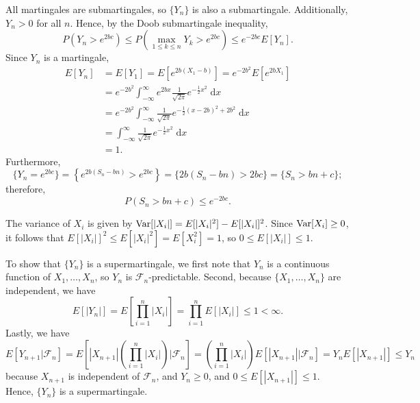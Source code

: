 \documentclass{homework}
\newcommand{\fil}{\mathcal{F}}
\begin{document}
	All martingales are submartingales, so $\{Y_n\}$ is also a submartingale. Additionally, $Y_n > 0$ for all $n$. Hence, by the Doob submartingale inequality,
	\begin{equation*}
		P\left(Y_n > e^{2bc}\right) \le P\left(\max_{1\le k\le n}Y_k > e^{2bc}\right) \le e^{-2bc}E[Y_n].
	\end{equation*}
	Since $Y_n$ is a martingale,
	\begin{align*}
		E[Y_n] &= E[Y_1] = E\left[e^{2b(X_1 - b)}\right] = e^{-2b^2}E\left[e^{2bX_1}\right] \\
		&= e^{-2b^2}\int_{-\infty}^\infty e^{2bx}\frac{1}{\sqrt{2\pi}}e^{-\frac{1}{2}x^2}\;\text{d}x \\
		&= e^{-2b^2}\int_{-\infty}^\infty \frac{1}{\sqrt{2\pi}}e^{-\frac{1}{2}(x-2b)^2 + 2b^2}\;\text{d}x \\
		&= \int_{-\infty}^\infty\frac{1}{\sqrt{2\pi}}e^{-\frac{1}{2}x^2}\;\text{d}x \\
		&= 1.
	\end{align*}
	Furthermore,
	\begin{equation*}
		\{Y_n = e^{2bc}\} = \left\{e^{2b(S_n - bn)} > e^{2bc}\right\} = \{2b(S_n - bn) > 2bc\} = \{S_n > bn + c\};
	\end{equation*}
	therefore,
	\begin{equation*}
		P(S_n > bn +c) \le e^{-2bc}.
	\end{equation*}
	
	\question The variance of $X_i$ is given by $\mathrm{Var}[|X_i|] = E[|X_i|^2] - E[|X_i|]^2$. Since $\mathrm{Var}[X_i] \ge 0$, it follows that $E[|X_i|]^2 \le E[|X_i|^2] = E[X_i^2] = 1$, so $0 \le E[|X_i|] \le 1$. 
	
	To show that $\{Y_n\}$ is a supermartingale, we first note that $Y_n$ is a continuous function of $X_1,\dots, X_n$, so $Y_n$ is $\fil_n$-predictable. Second, because $\{X_1,\dots, X_n\}$ are independent, we have
	\begin{equation*}
		E[|Y_n|] = E\left[\prod_{i=1}^n|X_i|\right] = \prod_{i=1}^nE[|X_i|] \le 1 < \infty.
	\end{equation*}
	Lastly, we have
	\begin{equation*}
		E[Y_{n+1}|\fil_n] = E\left[|X_{n+1}|\left(\prod_{i=1}^n|X_i|\right) \bigg|\fil_n\right] = \left(\prod_{i=1}^n|X_i|\right) E[|X_{n+1}||\fil_n] = Y_nE[|X_{n+1}|] \le Y_n
	\end{equation*}
	because $X_{n+1}$ is independent of $\fil_n$, and $Y_n \ge 0$, and $0 \le E[|X_{n+1}|] \le 1$. Hence, $\{Y_n\}$ is a supermartingale.
	
\end{document}
